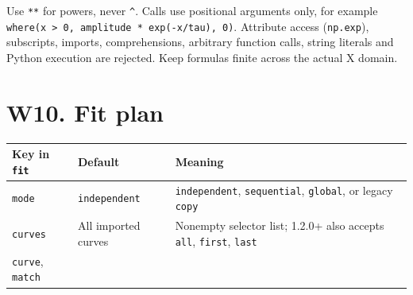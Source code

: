 \documentclass[
  10pt,
  a4paper,
  oneside]{scrreprt}
\begin{document}
Use \texttt{**} for powers, never \texttt{\^{}}. Calls use positional
arguments only, for example
\texttt{where(x\ \textgreater{}\ 0,\ amplitude\ *\ exp(-x/tau),\ 0)}.
Attribute access (\texttt{np.exp}), subscripts, imports, comprehensions,
arbitrary function calls, string literals and Python execution are
rejected. Keep formulas finite across the actual X domain.

\hypertarget{w10.-fit-plan}{%
\section{W10. Fit plan}\label{w10.-fit-plan}}

\begin{longtable}[]{@{}lll@{}}
\toprule
\begin{minipage}[b]{0.30\columnwidth}\raggedright
Key in \texttt{fit}\strut
\end{minipage} & \begin{minipage}[b]{0.30\columnwidth}\raggedright
Default\strut
\end{minipage} & \begin{minipage}[b]{0.30\columnwidth}\raggedright
Meaning\strut
\end{minipage}\tabularnewline
\midrule
\endhead
\begin{minipage}[t]{0.30\columnwidth}\raggedright
\texttt{mode}\strut
\end{minipage} & \begin{minipage}[t]{0.30\columnwidth}\raggedright
\texttt{independent}\strut
\end{minipage} & \begin{minipage}[t]{0.30\columnwidth}\raggedright
\texttt{independent}, \texttt{sequential}, \texttt{global}, or legacy
\texttt{copy}\strut
\end{minipage}\tabularnewline
\begin{minipage}[t]{0.30\columnwidth}\raggedright
\texttt{curves}\strut
\end{minipage} & \begin{minipage}[t]{0.30\columnwidth}\raggedright
All imported curves\strut
\end{minipage} & \begin{minipage}[t]{0.30\columnwidth}\raggedright
Nonempty selector list; 1.2.0+ also accepts \texttt{all},
\texttt{first}, \texttt{last}\strut
\end{minipage}\tabularnewline
\begin{minipage}[t]{0.30\columnwidth}\raggedright
\texttt{curve}, \texttt{match}\strut

\end{minipage}
\end{longtable}
\end{document}
